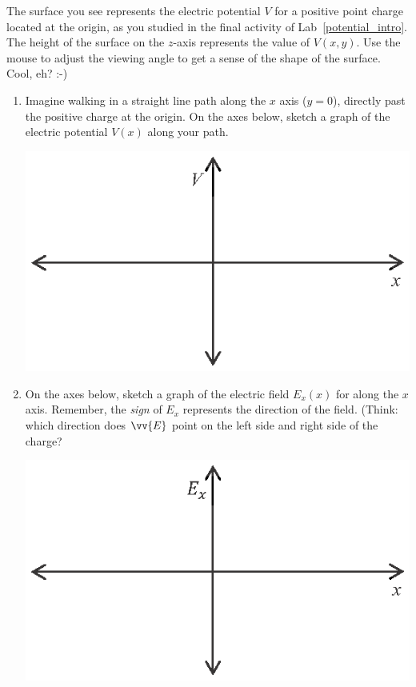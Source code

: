 The surface you see represents the electric potential $V$ for a positive point charge located at the origin, as you studied in the final activity of Lab~\ref{potential_intro}.  The height of the surface on the $z$-axis represents the value of $V(x,y)$.  Use the mouse to adjust the viewing angle to get a sense of the shape of the surface.  Cool, eh?  :-)

\begin{enumerate}[labparts]

\item Imagine walking in a straight line path along the $x$ axis ($y=0$), directly past the positive charge at the origin.  On the axes below, sketch a graph of the electric potential $V(x)$ along your path.  
\begin{center}
\includegraphics{potential_superposition/activity_1_figs/V_axes.eps}
\end{center}

\item On the axes below, sketch a graph of the electric field $E_x(x)$ for along the $x$ axis.  Remember, the \textit{sign} of $E_x$ represents the direction of the field.  (Think: which direction does $\vv{E}$ point on the left side and right side of the charge?
\begin{center}
\includegraphics{potential_superposition/activity_1_figs/E_axes.eps}
\end{center}


\end{enumerate}

